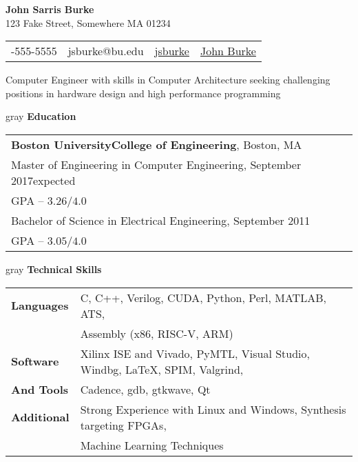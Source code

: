 \documentclass[10.5pt,letterpaper]{article}
\makeatletter
\newcommand{\org}[1]{\textbf{#1}}
\newcommand{\vertspace}{\vspace{1.2mm}}
\newcommand{\horzindent}{\hspace{3mm}}
\newcommand{\latex}{\LaTeX\space}
\newcommand{\tablewidth}{.9\linewidth}
\newcommand{\name}{John Sarris Burke}
\newcommand{\infoshift}{\hspace{15.5mm}}
\newcommand{\address}{123 Fake Street, Somewhere MA 01234}
\newcommand{\phone}{555-555-5555}
\newcommand{\email}{jsburke@bu.edu}
\newcommand{\github}{\href{https://github.com/jsburke/}{jsburke}}
\newcommand{\linkedin}{\href{https://www.linkedin.com/in/john-burke-51325935/}{John Burke}}
\newcommand{\undergradmajor}{Electrical Engineering}
\newcommand{\undergradend}{September 2011}
\newcommand{\grad}{Boston University}
\newcommand{\gradschool}{College of Engineering}
\newcommand{\gradmajor}{Computer Engineering}
\newcommand{\gradend}{September 2017}
\newcommand{\objective}{Computer Engineer with skills in Computer Architecture seeking challenging positions in hardware design and high performance programming}
\newlength\myheight
\newlength\mydepth
\newcommand*\inlineicon[1]{%
  \settototalheight\myheight{Xygp}%
  \settodepth\mydepth{Xygp}%
  \raisebox{-\mydepth}{\texttt{[image: \#1]}}%
}
\newcommand{\iconemail}{\inlineicon{email-icon-2048}\space}
\newcommand{\icongithub}{\inlineicon{GitHub-Mark-120px-plus}\space}
\newcommand{\iconphone}{\inlineicon{phone-icon-black}\space}
\newcommand{\iconlinkedin}{\inlineicon{linkedin-icon-black}\space}
\makeatother
\begin{document}
	
	\begin{center}	
		\textbf{\large \name}\\
		\address\\
		\begin{tabular}{c||c||c||c}
			\infoshift \iconphone \phone & \iconemail \email & \icongithub \github & \iconlinkedin \linkedin \\
		\end{tabular}
		\newline \objective
	\end{center}

	\noindent
	\begin{heading}{gray}
		\textbf{Education}
	\end{heading}
		\begin{tabular*}{\tablewidth}{l}
			\org{\grad\space\gradschool}, Boston, MA \\
			\horzindent Master of Engineering in \gradmajor , \gradend\space expected \\
			\horzindent GPA -- $3.26 / 4.0$ \\
			\horzindent Bachelor of Science in \undergradmajor , \undergradend \\
			\horzindent GPA -- $3.05 / 4.0$ \\
		\end{tabular*}

	\noindent
	\begin{heading}{gray}
		\textbf{Technical Skills}
	\end{heading}
	\begin{tabular*}{\tablewidth}{l|l}
		\textbf{Languages} & C, C++, Verilog, CUDA, Python, Perl, MATLAB, ATS,  \\
		  & Assembly (x86, RISC-V, ARM) \\ \hline %
		\textbf{Software} & Xilinx ISE and Vivado, PyMTL, Visual Studio, Windbg, \latex, SPIM, Valgrind, \\
		  \textbf{And Tools}& Cadence, gdb, gtkwave, Qt\\ \hline
		\textbf{Additional} & Strong Experience with Linux and Windows, Synthesis targeting FPGAs, \\
		& Machine Learning Techniques
	\end{tabular*}

	\iffalse
	
\end{document}
